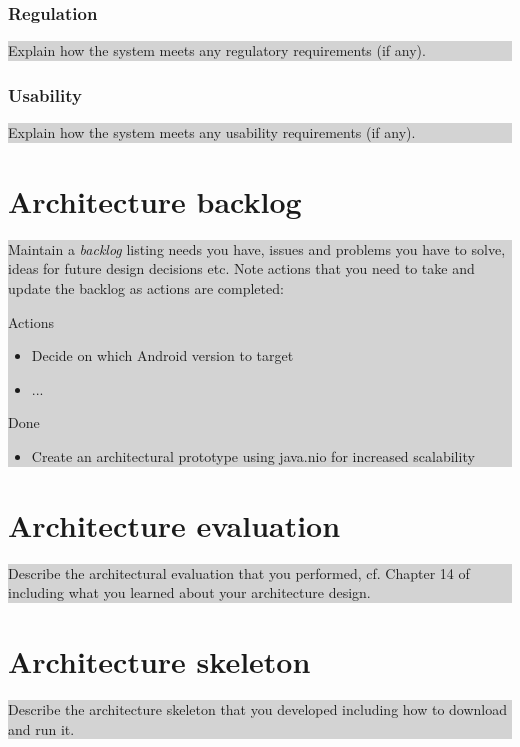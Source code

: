 \documentclass[a4paper,11pt]{report}
\newcommand{\instructions}[1]{
  \noindent\colorbox{lightgray}{%
    \parbox{\linewidth}{%
      #1
    }%
  }%
 \vspace{0.1cm}
}
\begin{document}
\subsection{Regulation}
\label{sec:regulation}

\instructions{
Explain how the system meets any regulatory requirements (if any).
}

\subsection{Usability}
\label{sec:usability}

\instructions{
Explain how the system meets any usability requirements (if any).
}

\appendix

\chapter{Architecture backlog}
\label{cha:architecture-backlog}
\thispagestyle{fancy}

\instructions{ Maintain a \emph{backlog} listing needs you have,
  issues and problems you have to solve, ideas for future design
  decisions etc. Note actions that you need to take and update the
  backlog as actions are completed:

\bigskip
Actions

\begin{itemize}
\item Decide on which Android version to target
\item ...
\end{itemize}

Done

\begin{itemize}
\item Create an architectural prototype using java.nio for increased
  scalability

\end{itemize}


}

\chapter{Architecture evaluation}
\label{cha:arch-eval}
\thispagestyle{fancy}

\instructions{
Describe the architectural evaluation that you performed, cf. Chapter
14 of~\citet{rozanski2011software} including what you learned about
your architecture design.
}

\chapter{Architecture skeleton}
\label{cha:arch-prot}
\thispagestyle{fancy}
\instructions{ 
Describe the architecture skeleton that you developed
  including how to download and run it.
}





% 
% 


\end{document}
